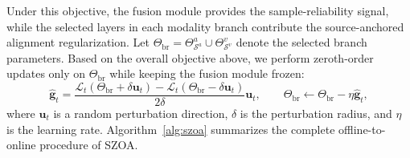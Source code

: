 Under this objective, the fusion module provides the sample-reliability signal, while the selected layers in each modality branch contribute the source-anchored alignment regularization.
Let $\Theta_{\mathrm{br}}=\Theta_{\mathcal S^a}^{a}\cup\Theta_{\mathcal S^v}^{v}$ denote the selected branch parameters.
Based on the overall objective above, we perform zeroth-order updates only on $\Theta_{\mathrm{br}}$ while keeping the fusion module frozen:
\begin{equation}
\label{eq:zoo_update}
\hat{\mathbf g}_t
=
\frac{
\mathcal L_t(\Theta_{\mathrm{br}}+\delta\mathbf u_t)
-
\mathcal L_t(\Theta_{\mathrm{br}}-\delta\mathbf u_t)
}{2\delta}\mathbf u_t,
\qquad
\Theta_{\mathrm{br}}
\leftarrow
\Theta_{\mathrm{br}}-\eta\hat{\mathbf g}_t,
\end{equation}
where $\mathbf u_t$ is a random perturbation direction, $\delta$ is the perturbation radius, and $\eta$ is the learning rate.
Algorithm~\ref{alg:szoa} summarizes the complete offline-to-online procedure of SZOA.

